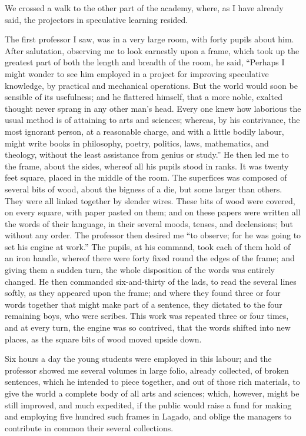 We crossed a walk to the other part of the academy, where, as I have already said, the projectors in speculative learning resided.

The first professor I saw, was in a very large room, with forty pupils about him.  After salutation, observing me to look earnestly upon a frame, which took up the greatest part of both the length and breadth of the room, he said, “Perhaps I might wonder to see him employed in a project for improving speculative knowledge, by practical and mechanical operations.  But the world would soon be sensible of its usefulness; and he flattered himself, that a more noble, exalted thought never sprang in any other man’s head.  Every one knew how laborious the usual method is of attaining to arts and sciences; whereas, by his contrivance, the most ignorant person, at a reasonable charge, and with a little bodily labour, might write books in philosophy, poetry, politics, laws, mathematics, and theology, without the least assistance from genius or study.”  He then led me to the frame, about the sides, whereof all his pupils stood in ranks.  It was twenty feet square, placed in the middle of the room.  The superfices was composed of several bits of wood, about the bigness of a die, but some larger than others.  They were all linked together by slender wires.  These bits of wood were covered, on every square, with paper pasted on them; and on these papers were written all the words of their language, in their several moods, tenses, and declensions; but without any order.  The professor then desired me “to observe; for he was going to set his engine at work.”  The pupils, at his command, took each of them hold of an iron handle, whereof there were forty fixed round the edges of the frame; and giving them a sudden turn, the whole disposition of the words was entirely changed.  He then commanded six-and-thirty of the lads, to read the several lines softly, as they appeared upon the frame; and where they found three or four words together that might make part of a sentence, they dictated to the four remaining boys, who were scribes.  This work was repeated three or four times, and at every turn, the engine was so contrived, that the words shifted into new places, as the square bits of wood moved upside down.


Six hours a day the young students were employed in this labour; and the professor showed me several volumes in large folio, already collected, of broken sentences, which he intended to piece together, and out of those rich materials, to give the world a complete body of all arts and sciences; which, however, might be still improved, and much expedited, if the public would raise a fund for making and employing five hundred such frames in Lagado, and oblige the managers to contribute in common their several collections.

